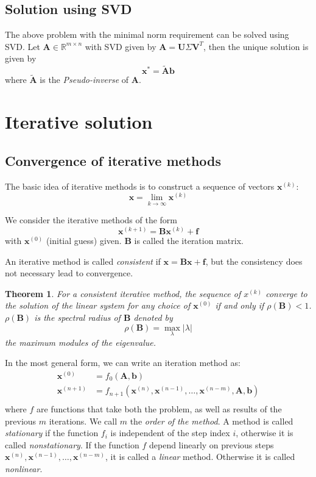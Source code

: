 \documentclass{article}
\newtheorem*{theorem}{Theorem}
\begin{document}
\subsection{Solution using SVD}
The above problem with the minimal norm requirement can be solved using SVD.
Let $\mathbf{A}\in \mathbb{R}^{m\times n}$ with SVD given by 
$\mathbf{A} = \mathbf{U}\Sigma \mathbf{V}^T$, then the unique solution is 
given by
\[\mathbf{x}^* = \tilde{\mathbf{A}} \mathbf{b}\]
where $\tilde{\mathbf{A}}$ is the \emph{Pseudo-inverse} of $\mathbf{A}$.

\section{Iterative solution}
\subsection{Convergence of iterative methods}
The basic idea of iterative methods is to construct a sequence of vectors 
$\mathbf{x}^{(k)}$:
\[\mathbf{x} = \lim_{k\to \infty} \mathbf{x}^{(k)}\]

We consider the iterative methods of the form 
\[\mathbf{x}^{(k+1)} = \mathbf{B}\mathbf{x}^{(k)} + \mathbf{f}\]
with $\mathbf{x}^{(0)}$ (initial guess) given. $\mathbf{B}$ is called the iteration matrix.

An iterative method is called \emph{consistent} if 
$\mathbf{x} = \mathbf{B}\mathbf{x} + \mathbf{f}$, but the consistency does not necessary lead
to convergence. 
\begin{theorem}
    For a consistent iterative method, the sequence of $x^{(k)}$ converge to the solution 
    of the linear system for any choice of $\mathbf{x}^{(0)}$ if and only if 
    $\rho(\mathbf{B}) < 1$. $\rho(\mathbf{B})$ is the spectral radius of $\mathbf{B}$ 
    denoted by
    \[\rho(\mathbf{B}) = \max_{\lambda} |\lambda|\] 
    the maximum modules of the eigenvalue.
\end{theorem}

In the most general form, we can write an iteration method as:
\begin{align*}
    \mathbf{x}^{(0)} &= f_0(\mathbf{A}, \mathbf{b}) \\
    \mathbf{x}^{(n+1)} &= f_{n+1}(\mathbf{x}^{(n)}, \mathbf{x}^{(n-1)}, \dots,  \mathbf{x}^{(n-m)}, \mathbf{A}, \mathbf{b}) \\
\end{align*}
where $f$ are functions that take both the problem, as well as results of the previous 
$m$ iterations. We call $m$ the \emph{order of the method}. 
A method is called \emph{stationary} if the function $f_i$ is independent of the step index $i$, 
otherwise it is called \emph{nonstationary}. If the function $f$ depend linearly on previous steps 
$\mathbf{x}^{(n)}, \mathbf{x}^{(n-1)}, \dots,  \mathbf{x}^{(n-m)}$, it is called a 
\emph{linear} method. Otherwise it is called \emph{nonlinear}. 
\end{document}
